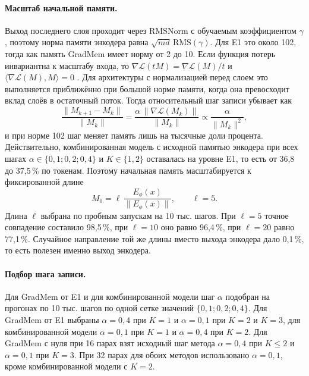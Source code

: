 \documentclass[a4paper,11pt]{article}
\newcommand{\cm}{\mathcal{L}}
\begin{document}
\paragraph{Масштаб начальной памяти.} Выход последнего слоя проходит через RMSNorm \cite{rmsnorm} с обучаемым коэффициентом $\gamma$, поэтому норма памяти энкодера равна $\sqrt{md}\,\mathrm{RMS}(\gamma)$. Для E1 это около 102, тогда как память GradMem имеет норму от 2 до 10. Если функция потерь инвариантна к масштабу входа, то $\nabla\cm(tM)=\nabla\cm(M)/t$ и $\langle\nabla\cm(M),M\rangle=0$ \cite{scaleinv}. Для архитектуры с нормализацией перед слоем \cite{prenorm} это выполняется приближённо при большой норме памяти, когда она превосходит вклад слоёв в остаточный поток. Тогда относительный шаг записи убывает как
\begin{equation}
\frac{\lVert M_{k+1}-M_k\rVert}{\lVert M_k\rVert} = \frac{\alpha\,\lVert\nabla\cm(M_k)\rVert}{\lVert M_k\rVert} \propto \frac{\alpha}{\lVert M_k\rVert^{2}}, \label{eq:relstep}
\end{equation}
и при норме 102 шаг меняет память лишь на тысячные доли процента. Действительно, комбинированная модель с исходной памятью энкодера при всех шагах $\alpha\in\{0{,}1;0{,}2;0{,}4\}$ и $K\in\{1,2\}$ оставалась на уровне E1, то есть от 36,8 до 37,5\,\% по токенам. Поэтому начальная память масштабируется к фиксированной длине
\begin{equation}
M_0 = \ell\,\frac{E_\phi(x)}{\lVert E_\phi(x)\rVert}, \qquad \ell = 5. \label{eq:scaled}
\end{equation}
Длина $\ell$ выбрана по пробным запускам на 10 тыс. шагов. При $\ell=5$ точное совпадение составило 98,5\,\%, при $\ell=10$ оно равно 96,4\,\%, при $\ell=20$ равно 77,1\,\%. Случайное направление той же длины вместо выхода энкодера дало 0,1\,\%, то есть полезен именно выход энкодера.

\paragraph{Подбор шага записи.} Для GradMem от E1 и для комбинированной модели шаг $\alpha$ подобран на прогонах по 10 тыс. шагов по одной сетке значений $\{0{,}1;0{,}2;0{,}4\}$. Для GradMem от E1 выбраны $\alpha=0{,}4$ при $K=1$ и $\alpha=0{,}1$ при $K=2$ и $K=3$, для комбинированной модели $\alpha=0{,}1$ при $K=1$ и $\alpha=0{,}4$ при $K=2$. Для GradMem с нуля при 16 парах взят исходный шаг метода $\alpha=0{,}4$ при $K\le2$ и $\alpha=0{,}1$ при $K=3$. При 32 парах для обоих методов использовано $\alpha=0{,}1$, кроме комбинированной модели с $K=2$.
\end{document}
